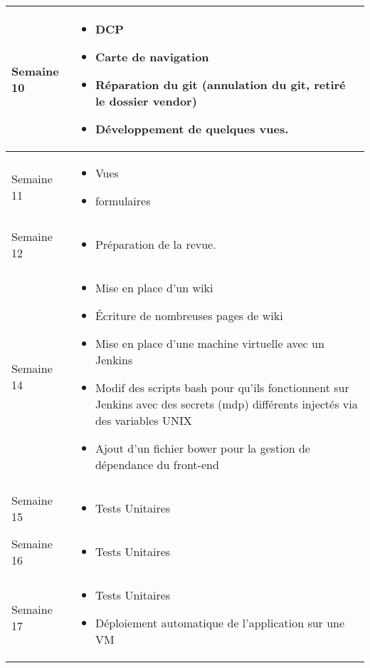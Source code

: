 \documentclass [a4paper] {article}
\begin{document}
\begin{longtable}{|>{\columncolor{gray!40}}p{2cm}|p{12cm}|}
	Semaine 10 & \begin{itemize}
		\item DCP
		\item Carte de navigation
		\item Réparation du git (annulation du git, retiré le dossier vendor)
		\item Développement de quelques vues.	
	\end{itemize} \\
	\hline
	
	Semaine 11 & \begin{itemize}
		\item Vues
		\item formulaires
	\end{itemize} \\
	\hline
	Semaine 12 & \begin{itemize}
	\item Préparation de la revue.
	\end{itemize} \\
	\hline
	
	
	Semaine 14 & \begin{itemize}
	\item Mise en place d'un wiki
	\item Écriture de nombreuses pages de wiki
	\item Mise en place d'une machine virtuelle avec un Jenkins
	\item Modif des scripts bash pour qu'ils fonctionnent sur Jenkins avec des secrets (mdp) différents injectés via des variables UNIX
	\item Ajout d'un fichier bower pour la gestion de dépendance du front-end
	\end{itemize} \\
	\hline
	
	Semaine 15 & \begin{itemize}
	\item Tests Unitaires
	\end{itemize} \\
	\hline

	Semaine 16 & \begin{itemize}
	\item Tests Unitaires
	\end{itemize} \\
	\hline
	
	Semaine 17 & \begin{itemize}
	\item Tests Unitaires
	\item Déploiement automatique de l'application sur une VM
	\end{itemize} \\
	\hline	
	
\end{longtable}
\end{document}
